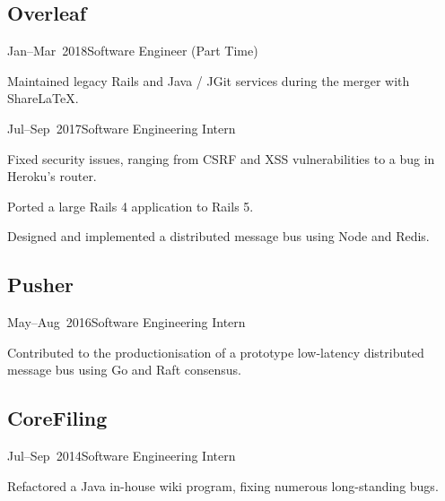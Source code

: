 \documentclass[a4paper]{barrucadu-cv}
\newcommand{\range}[2]{#1–#2}
\begin{document}
\subsection{Overleaf}

\begin{cventry}{\range{Jan}{Mar}~2018}{Software Engineer (Part Time)}
  \begin{tightitemize}
  \item Maintained legacy Rails and Java / JGit services during the merger with ShareLaTeX.
  \end{tightitemize}
\end{cventry}

\begin{cventry}{\range{Jul}{Sep}~2017}{Software Engineering Intern}
  \begin{tightitemize}
  \item Fixed security issues, ranging from CSRF and XSS vulnerabilities to a bug in Heroku's router.
  \item Ported a large Rails 4 application to Rails 5.
  \item Designed and implemented a distributed message bus using Node and Redis.
  \end{tightitemize}
\end{cventry}

\subsection{Pusher}

\begin{cventry}{\range{May}{Aug}~2016}{Software Engineering Intern}
  \begin{tightitemize}
  \item Contributed to the productionisation of a prototype low-latency distributed message bus using Go and Raft consensus.
  \end{tightitemize}
\end{cventry}

\subsection{CoreFiling}

\begin{cventry}{\range{Jul}{Sep}~2014}{Software Engineering Intern}
  \begin{tightitemize}
  \item Refactored a Java in-house wiki program, fixing numerous long-standing bugs.
  \end{tightitemize}
\end{cventry}
\end{document}
